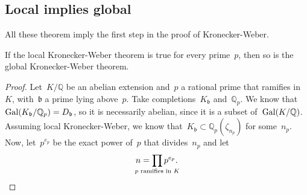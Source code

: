 \subsection{Local implies global}
All these theorem imply the first step in the proof of Kronecker-Weber.

\begin{theorem}
  If the local Kronecker-Weber theorem is true for every prime~$p$, then so is the global Kronecker-Weber theorem.

  \begin{proof}
    Let~$K/\mathbb{Q}$ be an abelian extension and~$p$ a rational prime that ramifies in~$K$, with~$\mathfrak{b}$ a prime lying above~$p$. Take completions~$K_\mathfrak{b}$ and~$\mathbb{Q}_p$. We know that~$\operatorname{Gal}(K_\mathfrak{b}/\mathbb{Q}_p) = D_\mathfrak{b}$, so it is necessarily abelian, since it is a subset of~$\operatorname{Gal}(K/\mathbb{Q})$. Assuming local Kronecker-Weber, we know that~$K_\mathfrak{b} \subset \mathbb{Q}_p(\zeta_{n_p})$ for some~$n_p$. Now, let~$p^{e_p}$ be the exact power of~$p$ that divides~$n_p$ and let
    \begin{equation}
      n = \prod_{\mathclap{p \text{ ramifies in } K}} p^{e_p}. 
    \end{equation}


\end{proof}
\end{theorem}
